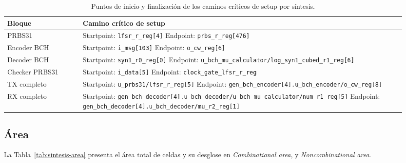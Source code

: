 \documentclass[10pt,a4paper]{article}
\begin{document}
\begin{table}[H]
    \centering
    \small
    \renewcommand{\arraystretch}{1.15}
    \begin{tabular}{@{}>{\raggedright\arraybackslash}p{0.18\linewidth}>{\raggedright\arraybackslash}p{0.77\linewidth}@{}}
        \toprule
        Bloque & Camino crítico de setup \\
        \midrule
        PRBS31 &
        Startpoint: \nolinkurl{lfsr_r_reg[4]}\newline
        Endpoint: \nolinkurl{prbs_r_reg[476]} \\[0.7em]
        Encoder BCH &
        Startpoint: \nolinkurl{i_msg[103]}\newline
        Endpoint: \nolinkurl{o_cw_reg[6]} \\[0.7em]
        Decoder BCH &
        Startpoint: \nolinkurl{syn1_r0_reg[0]}\newline
        Endpoint: \nolinkurl{u_bch_mu_calculator/log_syn1_cubed_r1_reg[6]} \\[0.7em]
        Checker PRBS31 &
        Startpoint: \nolinkurl{i_data[5]}\newline
        Endpoint: \nolinkurl{clock_gate_lfsr_r_reg} \\[0.7em]
        TX completo &
        Startpoint: \nolinkurl{u_prbs31/lfsr_r_reg[5]}\newline
        Endpoint: \nolinkurl{gen_bch_encoder[4].u_bch_encoder/o_cw_reg[8]} \\[0.7em]
        RX completo &
        Startpoint: \nolinkurl{gen_bch_decoder[4].u_bch_decoder/u_bch_mu_calculator/num_r1_reg[5]}\newline
        Endpoint: \nolinkurl{gen_bch_decoder[4].u_bch_decoder/mu_r2_reg[1]} \\[0.7em]
        \bottomrule
    \end{tabular}
    \caption{Puntos de inicio y finalización de los caminos críticos
    de setup por síntesis.}
    \label{tab:sintesis-caminos}
\end{table}

\subsection{Área}

La Tabla~\ref{tab:sintesis-area} presenta el área total de celdas y su
desglose en \textit{Combinational area}, y \textit{Noncombinational area}. 
\end{document}
